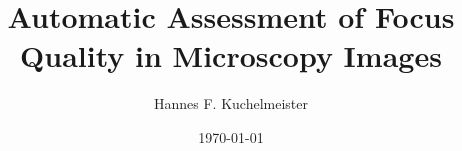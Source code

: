 \title{Automatic Assessment of Focus Quality in Microscopy Images}
\author{Hannes F. Kuchelmeister}
\date{\today}

\maketitle
